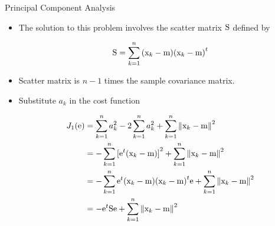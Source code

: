 \begin{frame}{Principal Component Analysis}
\begin{itemize}
\item The solution to this problem involves the scatter matrix ${\rm S}$ defined by
\begin{footnotesize}
\begin{equation}
{\rm S} = \sum\limits_{k = 1}^n {({{\rm x}_k} - {\rm m}){{({{\rm x}_k} - {\rm m})}^t}} \nonumber
\end{equation}
\end{footnotesize}
\item Scatter matrix is $n-1$ times the sample covariance matrix.
\item Substitute $a_k$ in the cost function
\begin{footnotesize}
\begin{align}
{J_1}({\rm e}) &= \sum\limits_{k = 1}^n {a_k^2}  - 2\sum\limits_{k = 1}^n {a_k^2}  + \sum\limits_{k = 1}^n {{{\left\| {{{\rm x}_k} - {\rm m}} \right\|}^2}}\nonumber\\
&=  - \sum\limits_{k = 1}^n {{{[{{\rm e}^t}({{\rm x}_k} - {\rm m})]}^2}}  + \sum\limits_{k = 1}^n {{{\left\| {{{\rm x}_k} - {\rm m}} \right\|}^2}} \nonumber\\
&=  - \sum\limits_{k = 1}^n {{{\rm e}^t}({{\rm x}_k} - {\rm m}){{({{\rm x}_k} - {\rm m})}^t}{\rm e}}  + \sum\limits_{k = 1}^n {{{\left\| {{{\rm x}_k} - {\rm m}} \right\|}^2}} \nonumber\\
& =  - {{\rm e}^t}{\rm S}{\rm e} + \sum\limits_{k = 1}^n {{{\left\| {{{\rm x}_k} - {\rm m}} \right\|}^2}} \nonumber
\end{align}
\end{footnotesize}
\end{itemize}
\end{frame}

